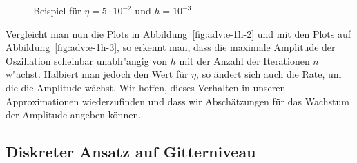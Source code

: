 \begin{figure}
\centering
{}
\caption{Beispiel für $\eta = 5\cdot 10^{-2}$ und $h=10^{-3}$}
\label{fig:adv:e5-2h-3}
\end{figure}

Vergleicht man nun die Plots in Abbildung~\ref{fig:adv:e-1h-2} und mit den Plots auf Abbildung~\ref{fig:adv:e-1h-3}, so erkennt man, dass die maximale Amplitude der Oszillation scheinbar unabh"angig von $h$ mit der Anzahl der Iterationen $n$ w"achst.
Halbiert man jedoch den Wert für $\eta$, so ändert sich auch die Rate, um die die Amplitude wächst.
Wir hoffen, dieses Verhalten in unseren Approximationen wiederzufinden und dass wir Abschätzungen für das Wachstum der Amplitude angeben können.



\subsection {Diskreter Ansatz auf Gitterniveau} \label{sec:transport:diskret}

